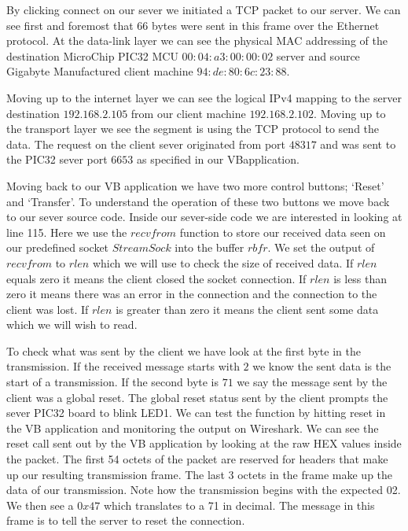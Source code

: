 \documentclass[12pt]{article}
\begin{document}
By clicking connect on our sever we initiated a TCP packet to our server. 
We can see first and foremost that 66 bytes were sent in this frame over 
the Ethernet protocol. At the data-link layer we can see the physical MAC 
addressing of the destination MicroChip PIC32 MCU $00:04:a3:00:00:02$ 
server and source Gigabyte Manufactured client machine $94:de:80:6c:23:88$. 

Moving up to the internet layer we can see the logical IPv4 mapping to the 
server destination $192.168.2.105$ from our client machine $192.168.2.102$. 
Moving up to the transport layer we see the segment is using the TCP 
protocol to send the data. The request on the client sever originated from 
port $48317$ and was sent to the PIC32 sever port $6653$ as specified in
our VBapplication. 

Moving back to our VB application we have two more control buttons; ‘Reset’ 
and ‘Transfer’. To understand the operation of these two buttons we move 
back to our sever source code. Inside our sever-side code we are interested 
in looking at line 115. Here we use the $recvfrom$ function to store our 
received data seen on our predefined socket $StreamSock$ into the buffer 
$rbfr$. We set the output of $recvfrom$ to $rlen$ which we will use to check 
the size of received data. If $rlen$ equals zero it means the client closed 
the socket connection. If $rlen$ is less than zero it means there was an 
error in the connection and the connection to the client was lost. If 
$rlen$ is greater than zero it means the client sent some data which we 
will wish to read. 

To check what was sent by the client we have look at the first byte in the 
transmission. If the received message starts with $2$ we know the sent data 
is the start of a transmission. If the second byte is $71$ we say the 
message sent by the client was a global reset. The global reset status 
sent by the client prompts the sever PIC32 board to blink LED1. We can test 
the function by hitting reset in the VB application and monitoring the 
output on Wireshark. We can see the reset call sent out by the VB 
application by looking at the raw HEX values inside the packet. The first 
54 octets of the packet are reserved for headers that make up our resulting 
transmission frame. The last 3 octets in the frame make up the data of our 
transmission. Note how the transmission begins with the expected 02. We 
then see a $0x47$ which translates to a 71 in decimal. The message in this 
frame is to tell the server to reset the connection. 
\end{document}
